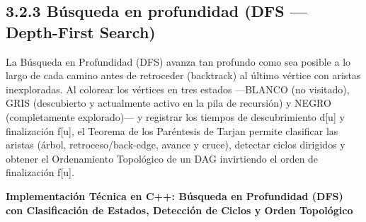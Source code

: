 \documentclass[11pt,letterpaper]{article}
\begin{document}
\subsection*{3.2.3 Búsqueda en profundidad (DFS — Depth-First Search)}
La Búsqueda en Profundidad (DFS) avanza tan profundo como sea posible a lo largo de cada camino antes de retroceder (backtrack) al último vértice con aristas inexploradas. Al colorear los vértices en tres estados —BLANCO (no visitado), GRIS (descubierto y actualmente activo en la pila de recursión) y NEGRO (completamente explorado)— y registrar los tiempos de descubrimiento d[u] y finalización f[u], el Teorema de los Paréntesis de Tarjan permite clasificar las aristas (árbol, retroceso/back-edge, avance y cruce), detectar ciclos dirigidos y obtener el Ordenamiento Topológico de un DAG invirtiendo el orden de finalización f[u].\par
\vspace{4pt}\noindent\textbf{\color{ipnblue}Implementación Técnica en C++: Búsqueda en Profundidad (DFS) con Clasificación de Estados, Detección de Ciclos y Orden Topológico}\par\vspace{-2pt}
\end{document}
